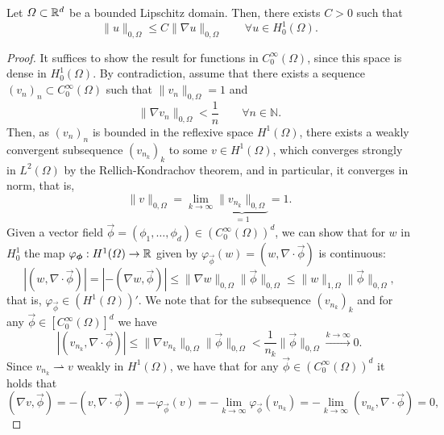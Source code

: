 \begin{lemma} Let $\Omega\subset \mathbb{R}^d$ be a bounded Lipschitz domain. Then, there exists $C>0$ such that
\begin{equation}\label{eq:poincare-inequality}
    \|u\|_{0,\Omega} \leq C\|\nabla u\|_{0,\Omega} \qquad \forall u\in H^1_0(\Omega).
\end{equation}
\begin{proof}
    It suffices to show the result for functions in $C_0^\infty(\Omega)$, since this space is dense in $H_0^1(\Omega)$. By contradiction, assume that there exists a sequence $(v_n)_n\subset C_0^\infty(\Omega)$ such that $\|v_n\|_{0,\Omega}=1$ and 
    \begin{equation*}
        \|\nabla v_n\|_{0,\Omega} < \frac{1}{n} \qquad \forall n\in \mathbb{N}.
    \end{equation*}
    Then, as $(v_n)_n$ is bounded in the reflexive space $H^1(\Omega)$, there exists a weakly convergent subsequence $(v_{n_k})_k$ to some $v\in H^1(\Omega)$, which converges strongly in $L^2(\Omega)$ by the Rellich-Kondrachov theorem, and in particular, it converges in norm, that is,
    \begin{equation*}
        \|v\|_{0,\Omega} = \lim_{k\to\infty} \underbrace{\|v_{n_k}\|_{0,\Omega}}_{=1} = 1.
    \end{equation*}
    Given a vector field $\vec\phi = (\phi_1,\dots,\phi_d)\in (C_0^\infty(\Omega))^d$, we can show that for $w$ in $H_0^1$ the map $\varphi_{\vec{\phi}}:H^1(\Omega)\to\R$ given by $\varphi_{\vec{\phi}}(w) = (w, \nabla\cdot \vec \phi)$ is continuous:
    \begin{equation*}
        |(w,\nabla\cdot\vec\phi)| = |-(\nabla w, \vec\phi)| \leq \|\nabla w\|_{0,\Omega}\|\vec\phi\|_{0,\Omega} \leq \|w\|_{1,\Omega}\|\vec\phi\|_{0,\Omega},
    \end{equation*}
    that is, $\varphi_{\vec{\phi}} \in (H^1(\Omega))'$. We note that for the subsequence $(v_{n_k})_k$ and for any $\vec\phi \in [C_0^\infty(\Omega)]^d$ we have 
    \begin{equation*}
        |(v_{n_k},\nabla\cdot\vec\phi)| \leq \|\nabla v_{n_k}\|_{0,\Omega}\|\vec\phi\|_{0,\Omega} < \frac{1}{n_k}\|\vec\phi\|_{0,\Omega}\overset{k\to\infty}{\longrightarrow} 0.
    \end{equation*}
    Since $v_{n_k} \rightharpoonup v$ weakly in $H^1(\Omega)$, we have that for any $\vec\phi \in (C_0^\infty(\Omega))^d$ it holds that
    \begin{equation*}
        (\nabla v,\vec\phi) = -(v,\nabla\cdot\vec\phi) = -\varphi_{\vec{\phi}}(v) = -\lim_{k\to\infty} \varphi_{\vec{\phi}}(v_{n_k}) = -\lim_{k\to\infty} (v_{n_k},\nabla\cdot\vec\phi) = 0,

\end{equation*}
\end{proof}
\end{lemma}

